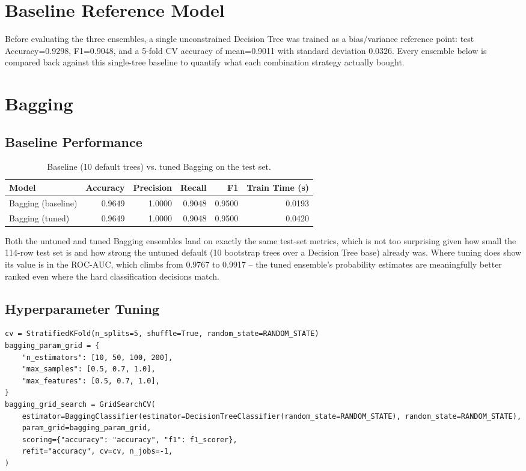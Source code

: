 \documentclass[11pt,a4paper]{article}
\begin{document}
\section{Baseline Reference Model}
Before evaluating the three ensembles, a single unconstrained Decision Tree was trained as a bias/variance reference point: test Accuracy=0.9298, F1=0.9048, and a 5-fold CV accuracy of mean=0.9011 with standard deviation 0.0326. Every ensemble below is compared back against this single-tree baseline to quantify what each combination strategy actually bought.

\section{Bagging}

\subsection{Baseline Performance}
\begin{table}[h]
\centering
\begin{tabular}{@{}lrrrrr@{}}
\toprule
Model & Accuracy & Precision & Recall & F1 & Train Time (s) \\
\midrule
Bagging (baseline) & 0.9649 & 1.0000 & 0.9048 & 0.9500 & 0.0193 \\
Bagging (tuned) & 0.9649 & 1.0000 & 0.9048 & 0.9500 & 0.0420 \\
\bottomrule
\end{tabular}
\caption{Baseline (10 default trees) vs. tuned Bagging on the test set.}
\end{table}
Both the untuned and tuned Bagging ensembles land on exactly the same test-set metrics, which is not too surprising given how small the 114-row test set is and how strong the untuned default (10 bootstrap trees over a Decision Tree base) already was. Where tuning does show its value is in the ROC-AUC, which climbs from 0.9767 to 0.9917 -- the tuned ensemble's probability estimates are meaningfully better ranked even where the hard classification decisions match.

\subsection{Hyperparameter Tuning}
\begin{lstlisting}
cv = StratifiedKFold(n_splits=5, shuffle=True, random_state=RANDOM_STATE)
bagging_param_grid = {
    "n_estimators": [10, 50, 100, 200],
    "max_samples": [0.5, 0.7, 1.0],
    "max_features": [0.5, 0.7, 1.0],
}
bagging_grid_search = GridSearchCV(
    estimator=BaggingClassifier(estimator=DecisionTreeClassifier(random_state=RANDOM_STATE), random_state=RANDOM_STATE),
    param_grid=bagging_param_grid,
    scoring={"accuracy": "accuracy", "f1": f1_scorer},
    refit="accuracy", cv=cv, n_jobs=-1,
)
\end{lstlisting}
\end{document}
